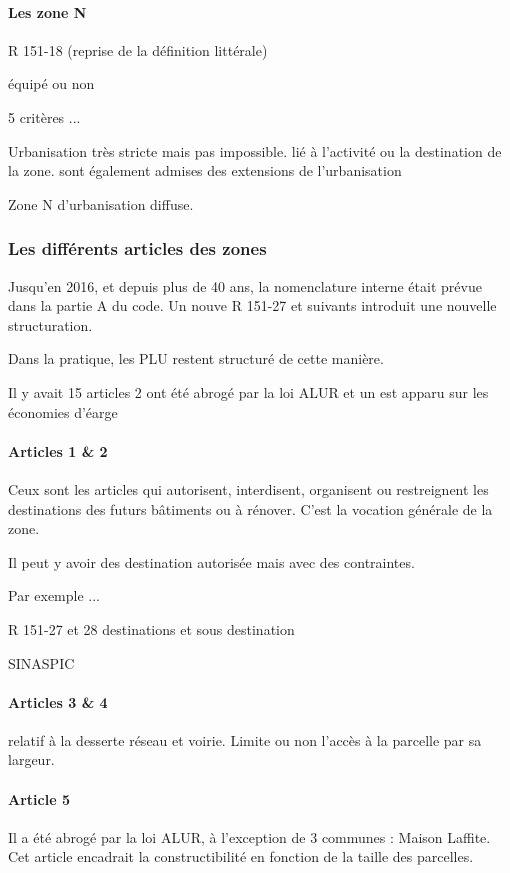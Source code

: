 		\paragraph{Les zone N} R 151-18 (reprise de la définition littérale)

			équipé ou non

			5 critères ...

			Urbanisation très stricte mais pas impossible. lié à l'activité ou la destination de la zone. sont également admises des extensions de l'urbanisation

			Zone N d'urbanisation diffuse.

		\subsubsection{Les différents articles des zones}

			Jusqu'en 2016, et depuis plus de 40 ans, la nomenclature interne était prévue dans la partie A du code. Un nouve R 151-27 et suivants introduit une nouvelle structuration.

			Dans la pratique, les PLU restent structuré de cette manière.

			Il y avait 15 articles 2 ont été abrogé par la loi ALUR et un est apparu sur les économies d'éarge

			\paragraph{Articles 1 \& 2} Ceux sont les articles qui autorisent, interdisent, organisent ou restreignent les destinations des futurs bâtiments ou à rénover. C’est la vocation générale de la zone.

			Il peut y avoir des destination autorisée mais avec des contraintes.

			Par exemple ...

			R 151-27 et 28 destinations et sous destination

			SINASPIC

			\paragraph{Articles 3 \& 4} relatif à la desserte réseau et voirie. Limite ou non l’accès à la parcelle par sa largeur.

			\paragraph{Article 5} Il a été abrogé par la loi ALUR, à l'exception de 3 communes : Maison Laffite. Cet article encadrait la constructibilité en fonction de la taille des parcelles.

